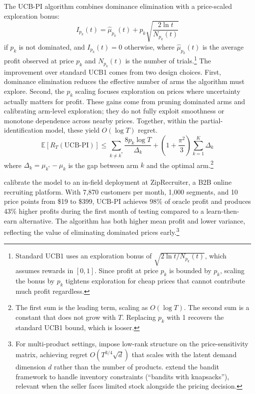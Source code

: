The UCB-PI algorithm combines dominance elimination with a price-scaled exploration bonus:
\begin{equation}
\label{eq:ucbpi}
I_{p_k}(t) = \hat{\mu}_{p_k}(t) + p_k \sqrt{\frac{2 \ln t}{N_{p_k}(t)}}
\end{equation}
if $p_k$ is not dominated, and $I_{p_k}(t) = 0$ otherwise, where $\hat{\mu}_{p_k}(t)$ is the average profit observed at price $p_k$ and $N_{p_k}(t)$ is the number of trials.\footnote{Standard UCB1 uses an exploration bonus of $\sqrt{2\ln t / N_{p_k}(t)}$, which assumes rewards in $[0,1]$. Since profit at price $p_k$ is bounded by $p_k$, scaling the bonus by $p_k$ tightens exploration for cheap prices that cannot contribute much profit regardless.} The improvement over standard UCB1 comes from two design choices. First, dominance elimination reduces the effective number of arms the algorithm must explore. Second, the $p_k$ scaling focuses exploration on prices where uncertainty actually matters for profit. These gains come from pruning dominated arms and calibrating arm-level exploration; they do not fully exploit smoothness or monotone dependence across nearby prices. Together, within the partial-identification model, these yield $O(\log T)$ regret.
\begin{equation}
\mathbb{E}[R_T(\text{UCB-PI})] \leq \sum_{k \neq k^*} \frac{8 p_k \log T}{\Delta_k} + \left(1 + \frac{\pi^2}{3}\right) \sum_{k=1}^K \Delta_k
\end{equation}
where $\Delta_k = \mu_{k^*} - \mu_k$ is the gap between arm $k$ and the optimal arm.\footnote{The first sum is the leading term, scaling as $O(\log T)$. The second sum is a constant that does not grow with $T$. Replacing $p_k$ with 1 recovers the standard UCB1 bound, which is looser.}

\citet{Misra2019} calibrate the model to an in-field deployment at ZipRecruiter, a B2B online recruiting platform. With 7,870 customers per month, 1,000 segments, and 10 price points from \$19 to \$399, UCB-PI achieves 98\% of oracle profit and produces 43\% higher profits during the first month of testing compared to a learn-then-earn alternative. The algorithm has both higher mean profit and lower variance, reflecting the value of eliminating dominated prices early.\footnote{For multi-product settings, \citet{Mueller2019} impose low-rank structure on the price-sensitivity matrix, achieving regret $O(T^{3/4}\sqrt{d})$ that scales with the latent demand dimension $d$ rather than the number of products. \citet{Badanidiyuru2013} extend the bandit framework to handle inventory constraints (``bandits with knapsacks''), relevant when the seller faces limited stock alongside the pricing decision.}

